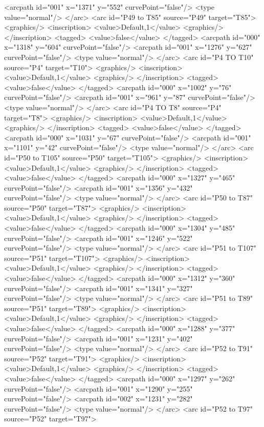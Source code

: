 <arcpath id="001" x="1371" y="552" curvePoint="false"/>
<type value="normal"/>
</arc>
<arc id="P49 to T85" source="P49" target="T85">
<graphics/>
<inscription>
<value>Default,1</value>
<graphics/>
</inscription>
<tagged>
<value>false</value>
</tagged>
<arcpath id="000" x="1318" y="604" curvePoint="false"/>
<arcpath id="001" x="1276" y="627" curvePoint="false"/>
<type value="normal"/>
</arc>
<arc id="P4 TO T10" source="P4" target="T10">
<graphics/>
<inscription>
<value>Default,1</value>
<graphics/>
</inscription>
<tagged>
<value>false</value>
</tagged>
<arcpath id="000" x="1002" y="76" curvePoint="false"/>
<arcpath id="001" x="961" y="87" curvePoint="false"/>
<type value="normal"/>
</arc>
<arc id="P4 TO T8" source="P4" target="T8">
<graphics/>
<inscription>
<value>Default,1</value>
<graphics/>
</inscription>
<tagged>
<value>false</value>
</tagged>
<arcpath id="000" x="1031" y="67" curvePoint="false"/>
<arcpath id="001" x="1101" y="42" curvePoint="false"/>
<type value="normal"/>
</arc>
<arc id="P50 to T105" source="P50" target="T105">
<graphics/>
<inscription>
<value>Default,1</value>
<graphics/>
</inscription>
<tagged>
<value>false</value>
</tagged>
<arcpath id="000" x="1327" y="465" curvePoint="false"/>
<arcpath id="001" x="1356" y="432" curvePoint="false"/>
<type value="normal"/>
</arc>
<arc id="P50 to T87" source="P50" target="T87">
<graphics/>
<inscription>
<value>Default,1</value>
<graphics/>
</inscription>
<tagged>
<value>false</value>
</tagged>
<arcpath id="000" x="1304" y="485" curvePoint="false"/>
<arcpath id="001" x="1246" y="522" curvePoint="false"/>
<type value="normal"/>
</arc>
<arc id="P51 to T107" source="P51" target="T107">
<graphics/>
<inscription>
<value>Default,1</value>
<graphics/>
</inscription>
<tagged>
<value>false</value>
</tagged>
<arcpath id="000" x="1312" y="360" curvePoint="false"/>
<arcpath id="001" x="1341" y="327" curvePoint="false"/>
<type value="normal"/>
</arc>
<arc id="P51 to T89" source="P51" target="T89">
<graphics/>
<inscription>
<value>Default,1</value>
<graphics/>
</inscription>
<tagged>
<value>false</value>
</tagged>
<arcpath id="000" x="1288" y="377" curvePoint="false"/>
<arcpath id="001" x="1231" y="402" curvePoint="false"/>
<type value="normal"/>
</arc>
<arc id="P52 to T91" source="P52" target="T91">
<graphics/>
<inscription>
<value>Default,1</value>
<graphics/>
</inscription>
<tagged>
<value>false</value>
</tagged>
<arcpath id="000" x="1297" y="262" curvePoint="false"/>
<arcpath id="001" x="1290" y="255" curvePoint="false"/>
<arcpath id="002" x="1231" y="282" curvePoint="false"/>
<type value="normal"/>
</arc>
<arc id="P52 to T97" source="P52" target="T97">
